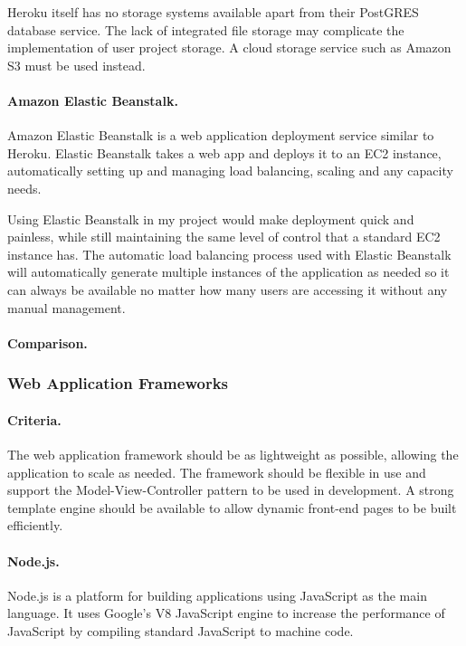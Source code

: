 \documentclass[a4paper, 12pt]{article}
\begin{document}
Heroku itself has no storage systems available apart from their PostGRES database service. The lack of integrated file storage may complicate the implementation of user project storage. A cloud storage service such as Amazon S3 must be used instead.

\paragraph{Amazon Elastic Beanstalk.}
Amazon Elastic Beanstalk is a web application deployment service similar to Heroku. Elastic Beanstalk takes a web app and deploys it to an EC2 instance, automatically setting up and managing load balancing, scaling and any capacity needs.\cite{awselasticbeanstalk}

Using Elastic Beanstalk in my project would make deployment quick and painless, while still maintaining the same level of control that a standard EC2 instance has. The automatic load balancing process used with Elastic Beanstalk will automatically generate multiple instances of the application as needed so it can always be available no matter how many users are accessing it without any manual management.

\paragraph{Comparison.}

\subsubsection{Web Application Frameworks}
\paragraph{Criteria.}
The web application framework should be as lightweight as possible, allowing the application to scale as needed. The framework should be flexible in use and support the Model-View-Controller pattern to be used in development. A strong template engine should be available to allow dynamic front-end pages to be built efficiently.

\paragraph{Node.js.}
Node.js is a platform for building applications using JavaScript as the main language. It uses Google's V8 JavaScript engine to increase the performance of JavaScript by compiling standard JavaScript to machine code.\cite{nodejs}
\end{document}
